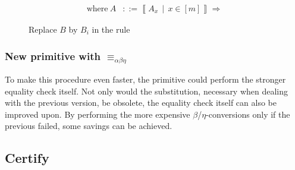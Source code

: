 \begin{figure}[ht]
\newcommand\A{\left\llbracket A_x\,\middle|\, x \in \left[ m \right] \right\rrbracket \Longrightarrow}
\centering
{}
\begin{align*}
  \text{where}~A &::= \left\llbracket A_x\,\middle|\, x \in \left[ m \right] \right\rrbracket \Longrightarrow
\end{align*}
\caption{Replace $B$ by $B_i$ in the rule}
\label{fig:replace_b}
\end{figure}


\subsubsection{New primitive with $\equiv_{\alpha\beta\eta}$}

To make this procedure even faster, the primitive could perform the stronger equality check itself. Not only would the substitution, necessary when dealing with the previous version, be obsolete, the equality check itself can also be improved upon. By performing the more expensive $\beta$/$\eta$-conversions only if the previous failed, some savings can be achieved.

\subsection{Certify}

